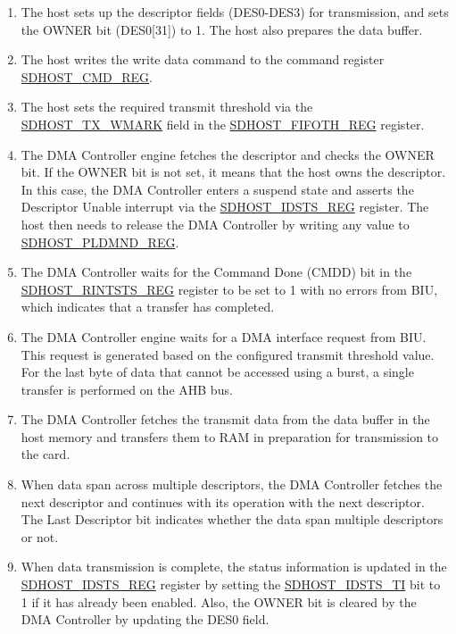 \documentclass[main\_\_EN.tex]{subfiles}
\begin{document}
\begin{enumerate}
\item The host sets up the descriptor fields (DES0-DES3) for transmission, and sets the OWNER bit (DES0[31]) to 1. The host also prepares the data buffer. 
\item The host writes the write data command to the command register \hyperref[regdesc:SDHOSTCMDREG]{SDHOST\_CMD\_REG}. 
\item The host sets the required transmit threshold via the \hyperref[fielddesc:SDHOSTTXWMARK]{SDHOST\_TX\_WMARK} field in the \hyperref[regdesc:SDHOSTFIFOTHREG]{SDHOST\_FIFOTH\_REG} register. 
\item The DMA Controller engine fetches the descriptor and checks the OWNER bit. If the OWNER bit is not set, it means that the host owns the descriptor. In this case, the DMA Controller enters a suspend state and asserts the Descriptor Unable interrupt via the \hyperref[regdesc:SDHOSTIDSTSREG]{SDHOST\_IDSTS\_REG} register. The host then needs to release the DMA Controller by writing any value to \hyperref[regdesc:SDHOSTPLDMNDREG]{SDHOST\_PLDMND\_REG}. 
\item The DMA Controller waits for the Command Done (CMDD) bit in the \hyperref[regdesc:SDHOSTRINTSTSREG]{SDHOST\_RINTSTS\_REG} register to be set to 1 with no errors from BIU, which indicates that a transfer has completed. 
\item The DMA Controller engine waits for a DMA interface request from BIU. This request is generated based on the configured transmit threshold value. For the last byte of data that cannot be accessed using a burst, a single transfer is performed on the AHB bus. 
\item The DMA Controller fetches the transmit data from the data buffer in the host memory and transfers them to RAM in preparation for transmission to the card. 
\item When data span across multiple descriptors, the DMA Controller fetches the next descriptor and continues with its operation with the next descriptor. The Last Descriptor bit indicates whether the data span multiple descriptors or not.
\item When data transmission is complete, the status information is updated in the \hyperref[regdesc:SDHOSTIDSTSREG]{SDHOST\_IDSTS\_REG} register by setting the \hyperref[fielddesc:SDHOSTIDSTSTI]{SDHOST\_IDSTS\_TI} bit to 1 if it has already been enabled. Also, the OWNER bit is cleared by the DMA Controller by updating the DES0 field. 
\end{enumerate}
\end{document}
